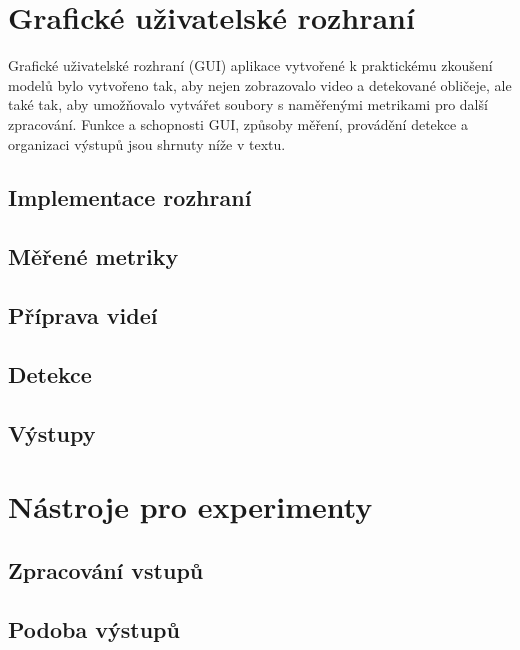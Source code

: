 \section{Grafické uživatelské rozhraní}
\label{sekce:gui}
Grafické uživatelské rozhraní (GUI) aplikace vytvořené k praktickému zkoušení modelů bylo vytvořeno tak, aby nejen zobrazovalo video a detekované obličeje, ale také tak, aby umožňovalo vytvářet soubory s naměřenými metrikami pro další zpracování. Funkce a schopnosti GUI, způsoby měření, provádění detekce a organizaci výstupů jsou shrnuty níže v textu. 

\subsection*{Implementace rozhraní}

\subsection*{Měřené metriky}

\subsection*{Příprava videí}


\subsection*{Detekce}


\subsection*{Výstupy}

\section{Nástroje pro experimenty}
\label{sekce:nastroje_pro_experimenty}

\subsection*{Zpracování vstupů}

\subsection*{Podoba výstupů}


